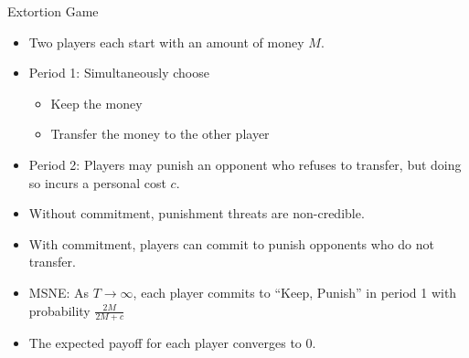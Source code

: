 \documentclass[aspectratio=169, handout]{beamer}
\begin{document}
\begin{frame}{Extortion Game}
\pause
\begin{itemize}
    \item Two players each start with an amount of money \(M\). \pause
    \item Period 1: Simultaneously choose
      \begin{itemize}
        \item Keep the money 
        \item Transfer the money to the other player \pause
      \end{itemize}
    \item Period 2: Players may punish an opponent who refuses to transfer, but doing so incurs a personal cost $c$. \pause
    \item Without commitment, punishment threats are non-credible. \pause
    \item With commitment, players can commit to punish opponents who do not transfer. \pause
    \item MSNE: As $T \to \infty$, each player commits to “Keep, Punish” in period 1 with probability
      $\frac{2M}{2M + c}$ \pause
    \item The expected payoff for each player converges to $0$.
\end{itemize}


  
    
\end{frame}
\end{document}
